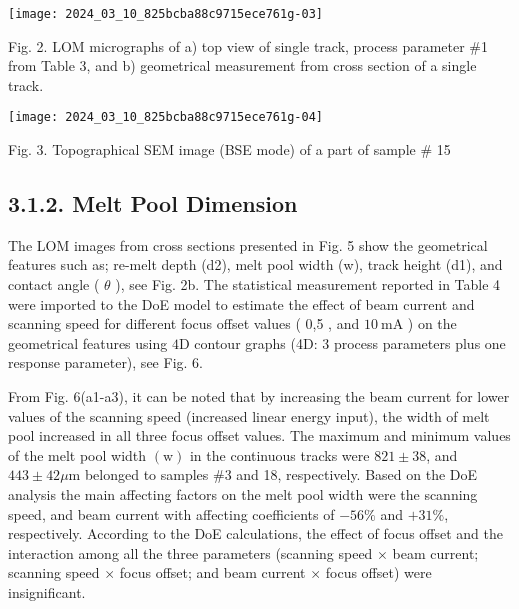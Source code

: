 \documentclass[10pt]{article}
\begin{document}
\begin{center}
\texttt{[image: 2024\_03\_10\_825bcba88c9715ece761g-03]}
\end{center}

Fig. 2. LOM micrographs of a) top view of single track, process parameter \#1 from Table 3, and b) geometrical measurement from cross section of a single track.

\begin{center}
\texttt{[image: 2024\_03\_10\_825bcba88c9715ece761g-04]}
\end{center}

Fig. 3. Topographical SEM image (BSE mode) of a part of sample \# 15

\subsection*{3.1.2. Melt Pool Dimension}
The LOM images from cross sections presented in Fig. 5 show the geometrical features such as; re-melt depth (d2), melt pool width (w), track height (d1), and contact angle ( $\theta$ ), see Fig. 2b. The statistical measurement reported in Table 4 were imported to the DoE model to estimate the effect of beam current and scanning speed for different focus offset values ( 0,5 , and $10 \mathrm{~mA}$ ) on the geometrical features using $4 \mathrm{D}$ contour graphs (4D: 3 process parameters plus one response parameter), see Fig. 6.

From Fig. 6(a1-a3), it can be noted that by increasing the beam current for lower values of the scanning speed (increased linear energy input), the width of melt pool increased in all three focus offset values. The maximum and minimum values of the melt pool width $(\mathrm{w})$ in the continuous tracks were $821 \pm 38$, and $443 \pm 42 \mu \mathrm{m}$ belonged to samples \#3 and 18, respectively. Based on the DoE analysis the main affecting factors on the melt pool width were the scanning speed, and beam current with affecting coefficients of $-56 \%$ and $+31 \%$, respectively. According to the DoE calculations, the effect of focus offset and the interaction among all the three parameters (scanning speed $\times$ beam current; scanning speed $\times$ focus offset; and beam current $\times$ focus offset) were insignificant.
\end{document}
